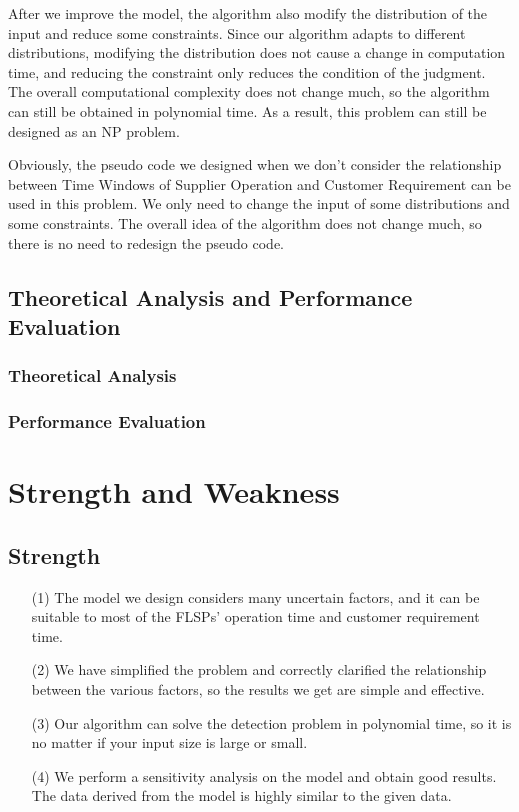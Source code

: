 \documentclass{llncs}
\begin{document}
After we improve the model, the algorithm also modify the distribution of the input and reduce some constraints. Since our algorithm adapts to different distributions, modifying the distribution does not cause a change in computation time, and reducing the constraint only reduces the condition of the judgment. The overall computational complexity does not change much, so the algorithm can still be obtained in polynomial time. As a result, this problem can still be designed as an NP problem.

Obviously, the pseudo code we designed when we don't consider the relationship between Time Windows of Supplier Operation and Customer Requirement can be used in this problem. We only need to change the input of some distributions and some constraints. The overall idea of the algorithm does not change much, so there is no need to redesign the pseudo code.
\subsection{Theoretical Analysis and Performance Evaluation}
\subsubsection{Theoretical Analysis}
\subsubsection{Performance Evaluation}


\section{Strength and Weakness}
\subsection{Strength}
\begin{itemize}
    \item[(1)]
    The model we design considers many uncertain factors, and it can be suitable to most of the FLSPs’ operation time and customer requirement time.

    \item[(2)]
    We have simplified the problem and correctly clarified the relationship between the various factors, so the results we get are simple and effective.

    \item[(3)]
    Our algorithm can solve the detection problem in polynomial time, so it is no matter if your input size is large or small.

    \item[(4)]
    We perform a sensitivity analysis on the model and obtain good results. The data derived from the model is highly similar to the given data.

\end{itemize}
\end{document}
